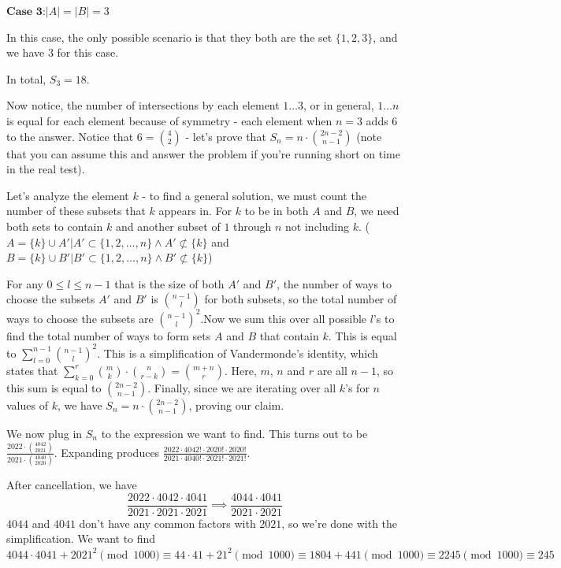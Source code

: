 \begin{enumerate}
 $\textbf{Case 3:} |A| = |B| = 3$

 In this case, the only possible scenario is that they both are the set $\{1,2,3\}$, and we have $3$ for this case.

 
In total, $S_3 = 18$.

 Now notice, the number of intersections by each element $1 \ldots 3$, or in general, $1 \ldots n$ is equal for each element because of symmetry - each element when $n=3$ adds $6$ to the answer. Notice that $6 = \binom{4}{2}$ - let's prove that $S_n = n \cdot \binom{2n-2}{n-1}$ (note that you can assume this and answer the problem if you're running short on time in the real test).

 Let's analyze the element $k$ - to find a general solution, we must count the number of these subsets that $k$ appears in. For $k$ to be in both $A$ and $B$, we need both sets to contain $k$ and another subset of $1$ through $n$ not including $k$. ($A = \{k\} \cup A'| A' \subset \{1,2,\ldots,n\} \land A' \not \subset \{k\}$ and $B = \{k\} \cup B'| B' \subset \{1,2,\ldots,n\} \land B' \not \subset \{k\}$)

 For any $0\leq l \leq n-1$ that is the size of both $A'$ and $B'$, the number of ways to choose the subsets $A'$ and $B'$ is $\binom{n-1}{l}$ for both subsets, so the total number of ways to choose the subsets are $\binom{n-1}{l}^2$.Now we sum this over all possible $l$'s to find the total number of ways to form sets $A$ and $B$ that contain $k$. This is equal to $\sum_{l=0}^{n-1} \binom{n-1}{l}^2$. This is a simplification of Vandermonde's identity, which states that $\sum_{k=0}^{r} \binom{m}{k} \cdot \binom{n}{r-k} = \binom{m+n}{r}$. Here, $m$, $n$ and $r$ are all $n-1$, so this sum is equal to $\binom{2n-2}{n-1}$. Finally, since we are iterating over all $k$'s for $n$ values of $k$, we have $S_n = n \cdot \binom{2n-2}{n-1}$, proving our claim.

 We now plug in $S_n$ to the expression we want to find. This turns out to be $\frac{2022 \cdot \binom{4042}{2021}}{2021 \cdot \binom{4040}{2020}}$. Expanding produces $\frac{2022 \cdot 4042!\cdot 2020! \cdot 2020!}{2021 \cdot 4040! \cdot 2021! \cdot 2021!}$.

 After cancellation, we have 
 \[\frac{2022 \cdot 4042 \cdot 4041}{2021 \cdot 2021 \cdot 2021} \implies \frac{4044\cdot 4041}{2021 \cdot 2021}\]
$4044$ and $4041$ don't have any common factors with $2021$, so we're done with the simplification. We want to find $4044 \cdot 4041 + 2021^2 \pmod{1000} \equiv 44 \cdot 41 + 21^2 \pmod{1000} \equiv 1804+441 \pmod{1000} \equiv 2245 \pmod{1000} \equiv \boxed{245}$





\end{enumerate}
